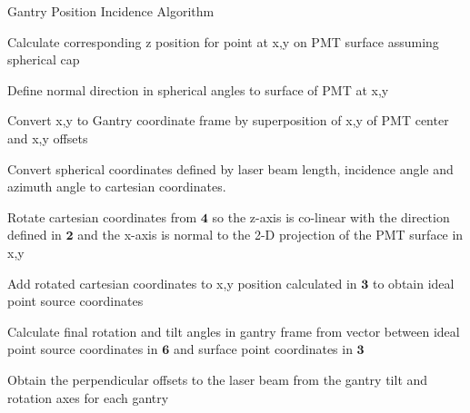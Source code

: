 \documentclass[journal]{IEEEtran}
\begin{document}
\begin{algorithm}[!htpb]
\caption{Gantry Position Incidence Algorithm}\label{incidence}



Calculate corresponding z position for point at x,y on PMT surface assuming spherical cap

Define normal direction in spherical angles to surface of PMT at x,y

Convert x,y to Gantry coordinate frame by superposition of x,y of PMT center and x,y offsets

Convert spherical coordinates defined by laser beam length, incidence angle and azimuth angle to cartesian coordinates.


Rotate cartesian coordinates from $\bm{4}$ so the z-axis is co-linear with the direction defined in $\bm{2}$ and the x-axis is normal to the 2-D projection of the PMT surface in x,y


Add rotated cartesian coordinates to x,y position calculated in $\bm{3}$ to obtain ideal point source coordinates

Calculate final rotation and tilt angles in gantry frame from vector between ideal point source coordinates in $\bm{6}$ and surface point coordinates in $\bm{3}$

Obtain the perpendicular offsets to the laser beam from the gantry tilt and rotation axes for each gantry



\end{algorithm}
\FloatBarrier
\end{document}
